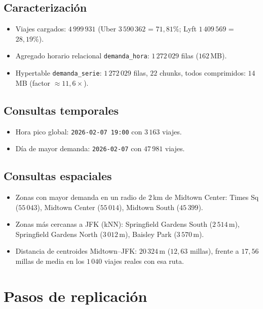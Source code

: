 \documentclass[11pt,a4paper]{article}
\begin{document}
\subsection{Caracterización}
\begin{itemize}
  \item Viajes cargados: $4\,999\,931$ (Uber $3\,590\,362$ = $71{,}81\%$; Lyft $1\,409\,569$
        = $28{,}19\%$).
  \item Agregado horario relacional \texttt{demanda\_hora}: $1\,272\,029$ filas ($162$\,MB).
  \item Hypertable \texttt{demanda\_serie}: $1\,272\,029$ filas, $22$ chunks, todos
        comprimidos: $14$\,MB (factor $\approx 11{,}6\times$).
\end{itemize}

\subsection{Consultas temporales}
\begin{itemize}
  \item Hora pico global: \texttt{2026-02-07 19:00} con $3\,163$ viajes.
  \item Día de mayor demanda: \texttt{2026-02-07} con $47\,981$ viajes.
\end{itemize}

\subsection{Consultas espaciales}
\begin{itemize}
  \item Zonas con mayor demanda en un radio de $2$\,km de Midtown Center: Times Sq
        ($55\,043$), Midtown Center ($55\,014$), Midtown South ($45\,399$).
  \item Zonas más cercanas a JFK (kNN): Springfield Gardens South ($2\,514$\,m), Springfield
        Gardens North ($3\,012$\,m), Baisley Park ($3\,570$\,m).
  \item Distancia de centroides Midtown--JFK: $20\,324$\,m ($12{,}63$ millas), frente a
        $17{,}56$ millas de media en los $1\,040$ viajes reales con esa ruta.
\end{itemize}

\section{Pasos de replicación}
\end{document}
